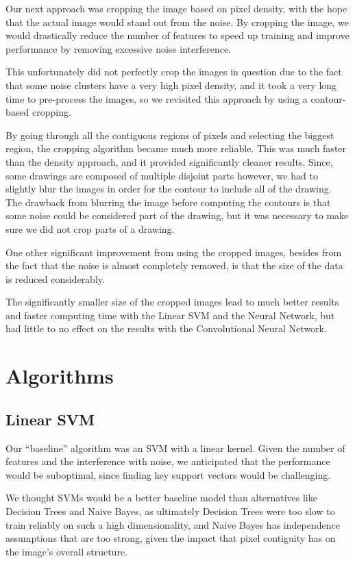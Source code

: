 \documentclass[conference]{IEEEtran}
\begin{document}
Our next approach was cropping the image based on pixel density, with the hope that the actual image would stand out from the noise. By cropping the image, we would drastically reduce the number of features to speed up training and improve performance by removing excessive noise interference.

This unfortunately did not perfectly crop the images in question due to the fact that some noise clusters have a very high pixel density, and it took a very long time to pre-process the images, so we revisited this approach by using a contour-based cropping.

By going through all the contiguous regions of pixels and selecting the biggest region, the cropping algorithm became much more reliable. This was much faster than the density approach, and it provided significantly cleaner results. Since, some drawings are composed of multiple disjoint parts however, we had to slightly blur the images in order for the contour to include all of the drawing. The drawback from blurring the image before computing the contours is that some noise could be considered part of the drawing, but it was necessary to make sure we did not crop parts of a drawing.

One other significant improvement from using the cropped images, besides from the fact that the noise is almost completely removed, is that the size of the data is reduced considerably. 

The significantly smaller size of the cropped images lead to much better results and faster computing time with the Linear SVM and the Neural Network, but had little to no effect on the results with the Convolutional Neural Network.
\section{\textbf{Algorithms}}

\subsection{Linear SVM}

Our ``baseline'' algorithm was an SVM with a linear kernel. Given the number of features and the interference with noise, we anticipated that the performance would be suboptimal, since finding key support vectors would be challenging.

We thought SVMs would be a better baseline model than alternatives like Decision Trees and Naive Bayes, as ultimately Decision Trees were too slow to train reliably on such a high dimensionality, and Naive Bayes has independence assumptions that are too strong, given the impact that pixel contiguity has on the image's overall structure. 
\end{document}
